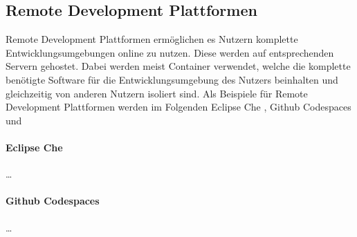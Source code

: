 \subsection{Remote Development Plattformen}\label{section:stand-der-technik:weitere-entwicklungen:remote-development-plattformen}

Remote Development Plattformen ermöglichen es Nutzern komplette Entwicklungsumgebungen online zu nutzen. Diese werden auf entsprechenden Servern gehostet. Dabei werden meist Container verwendet, welche die komplette benötigte Software für die Entwicklungsumgebung des Nutzers beinhalten und gleichzeitig von anderen Nutzern isoliert sind. Als Beispiele für Remote Development Plattformen werden im Folgenden Eclipse Che , Github Codespaces  und

\paragraph{Eclipse Che} \dots

\paragraph{Github Codespaces} \dots

\paragraph{}


